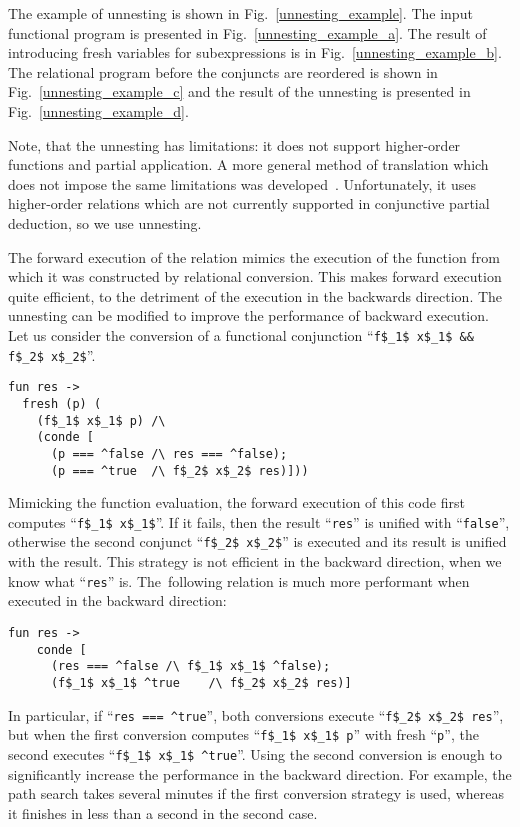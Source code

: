The example of unnesting is shown in Fig.~\ref{unnesting_example}. 
The input functional program is presented in Fig.~\ref{unnesting_example_a}. 
The result of introducing fresh variables for subexpressions is in Fig.~\ref{unnesting_example_b}.
The relational program before the conjuncts are reordered is shown in Fig.~\ref{unnesting_example_c} and the result of the unnesting is presented in Fig.~\ref{unnesting_example_d}.

Note, that the unnesting has limitations: it does not support higher-order functions and partial application. 
A more general method of translation which does not impose the same limitations was developed~\cite{lozov:conversion}. 
Unfortunately, it uses higher-order relations which are not currently supported in conjunctive partial deduction, so we use unnesting. 

The forward execution of the relation mimics the execution of the function from which it was constructed by relational conversion.
This makes forward execution quite efficient, to the detriment of the execution in the backwards direction. 
The unnesting can be modified to improve the performance of  backward execution. 
Let us consider the conversion of a functional conjunction ``\lstinline{f$_1$ x$_1$ && f$_2$ x$_2$}''.

\begin{lstlisting}
fun res ->
  fresh (p) (
    (f$_1$ x$_1$ p) /\
    (conde [
      (p === ^false /\ res === ^false);
      (p === ^true  /\ f$_2$ x$_2$ res)]))
\end{lstlisting}

Mimicking the function evaluation, the forward execution of this code first computes ``\lstinline{f$_1$ x$_1$}''. 
If it fails, then the result ``\lstinline{res}'' is unified with ``\lstinline{false}'', otherwise the second conjunct ``\lstinline{f$_2$ x$_2$}'' is executed and its result is unified with the result. 
This strategy is not efficient in the backward direction, when we know what ``\lstinline{res}'' is. 
The~following relation is much more performant when executed in the backward direction:

\begin{lstlisting}
fun res ->
    conde [
      (res === ^false /\ f$_1$ x$_1$ ^false);
      (f$_1$ x$_1$ ^true    /\ f$_2$ x$_2$ res)]
\end{lstlisting}

In particular, if ``\lstinline{res === ^true}'', both conversions execute ``\lstinline{f$_2$ x$_2$ res}'', but when the first conversion computes ``\lstinline{f$_1$ x$_1$ p}'' with fresh ``\lstinline{p}'', the second executes ``\lstinline{f$_1$ x$_1$ ^true}''. 
Using the second conversion is enough to significantly increase the performance in the backward direction. 
For example, the path search takes several minutes if the first conversion strategy is used, whereas it finishes in less than a second in the second case. 

